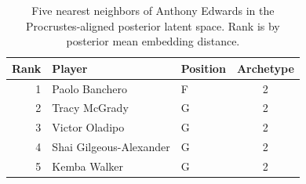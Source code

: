 \begin{table}[htbp]
  \centering\small
  \begin{tabular}{rllc}
    \toprule
    Rank & Player & Position & Archetype \\
    \midrule
    1 & Paolo Banchero & F & 2 \\
    2 & Tracy McGrady & G & 2 \\
    3 & Victor Oladipo & G & 2 \\
    4 & Shai Gilgeous-Alexander & G & 2 \\
    5 & Kemba Walker & G & 2 \\
    \bottomrule
  \end{tabular}
  \caption{Five nearest neighbors of Anthony Edwards in the Procrustes-aligned posterior latent space. Rank is by posterior mean embedding distance.}
  \label{tab:Anthony_Edwards_neighbors}
\end{table}

